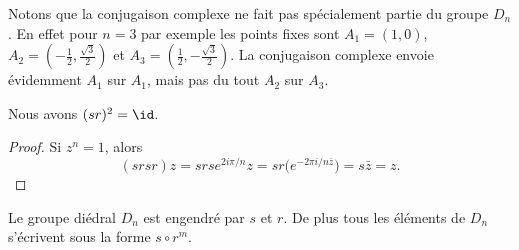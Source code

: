 Notons que la conjugaison complexe ne fait pas spécialement partie du groupe \( D_n\). En effet pour \( n=3\) par exemple les points fixes sont \( A_1=(1,0)\), \( A_2=(-\frac{ 1 }{2},\frac{ \sqrt{3} }{2})\) et \( A_3=(\frac{ 1 }{2},-\frac{ \sqrt{3} }{2})\). La conjugaison complexe envoie évidemment \( A_1\) sur \( A_1\), mais pas du tout \( A_2\) sur \( A_3\).

\begin{proposition}
    Nous avons \( (sr)^2=\id\).
\end{proposition}

\begin{proof}
    Si \( z^n=1\), alors
    \begin{equation}
        (srsr)z=srs e^{2 i\pi/n}z=sr\big( e^{-2\pi i/n\bar z}\big)=s\bar z=z.
    \end{equation}
\end{proof}

\begin{proposition} \label{PropLDIPoZ}
    Le groupe diédral \( D_n\) est engendré par \( s\) et \( r\). De plus tous les éléments de \( D_n\) s'écrivent sous la forme \( s\circ r^m\).
\end{proposition}

